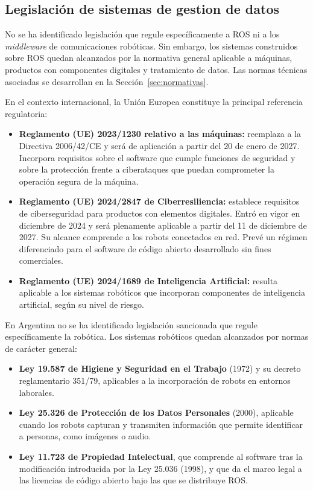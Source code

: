 \subsection{Legislación de sistemas de gestion de datos}
No se ha identificado legislación que regule específicamente a ROS ni a los
\textit{middleware} de comunicaciones robóticas. Sin embargo, los sistemas
construidos sobre ROS quedan alcanzados por la normativa general aplicable a
máquinas, productos con componentes digitales y tratamiento de datos. Las
normas técnicas asociadas se desarrollan en la Sección~\ref{sec:normativas}.

En el contexto internacional, la Unión Europea constituye la principal
referencia regulatoria:
\begin{itemize}
    \item \textbf{Reglamento (UE) 2023/1230 relativo a las máquinas:} reemplaza
    a la Directiva 2006/42/CE y será de aplicación a partir del 20 de enero
    de 2027.
    Incorpora requisitos sobre el software que cumple funciones de seguridad y
    sobre la protección frente a ciberataques que puedan comprometer la
    operación segura de la máquina.
    \item \textbf{Reglamento (UE) 2024/2847 de Ciberresiliencia:} establece
    requisitos de ciberseguridad para productos con elementos digitales. Entró
    en vigor en diciembre de 2024 y será plenamente aplicable a partir del 11
    de diciembre de 2027. Su alcance
    comprende a los robots conectados en red. Prevé un régimen diferenciado
    para el software de código abierto desarrollado sin fines comerciales.
    \item \textbf{Reglamento (UE) 2024/1689 de Inteligencia Artificial:}
    resulta aplicable a los sistemas robóticos que incorporan componentes de
    inteligencia artificial, según su nivel de riesgo.
\end{itemize}

En Argentina no se ha identificado legislación sancionada que regule
específicamente la robótica. Los
sistemas robóticos quedan alcanzados por normas de carácter general:
\begin{itemize}
    \item \textbf{Ley 19.587 de Higiene y Seguridad en el Trabajo} (1972) y su
    decreto reglamentario 351/79, aplicables a la incorporación de robots en
    entornos laborales.
    \item \textbf{Ley 25.326 de Protección de los Datos Personales} (2000),
    aplicable cuando los robots capturan y transmiten información que permite
    identificar a personas, como imágenes o audio.
    \item \textbf{Ley 11.723 de Propiedad Intelectual}, que comprende al
    software tras la modificación introducida por la Ley 25.036 (1998), y que
    da el
    marco legal a las licencias de código abierto bajo las que se distribuye
    ROS.
\end{itemize}